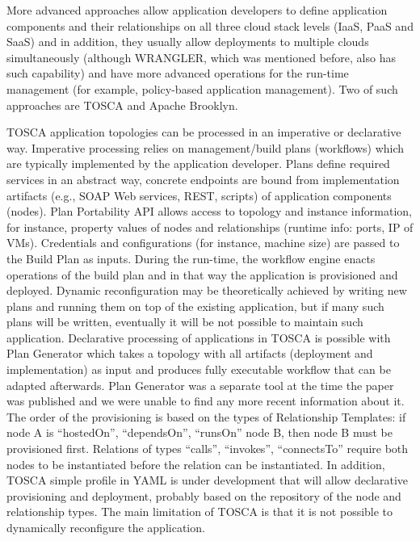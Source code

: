 \noindent 

\noindent More advanced approaches allow application developers to define application components and their relationships on all three cloud stack levels (IaaS, PaaS and SaaS) and in addition, they usually allow deployments to multiple clouds simultaneously (although WRANGLER, which was mentioned before, also has such capability) and have more advanced operations for the run-time management (for example, policy-based application management). Two of such approaches are TOSCA and Apache Brooklyn.  

\noindent 

\noindent TOSCA \cite{INPROC-2013-45} application topologies can be processed in an imperative or declarative way. Imperative processing relies on management/build plans (workflows) which are typically implemented by the application developer. Plans define required services in an abstract way, concrete endpoints are bound from implementation artifacts (e.g., SOAP Web services, REST, scripts) of application components (nodes). Plan Portability API allows access to topology and instance information, for instance, property values of nodes and relationships (runtime info: ports, IP of VMs). Credentials and configurations (for instance, machine size) are passed to the Build Plan as inputs. During the run-time, the workflow engine enacts operations of the build plan and in that way the application is provisioned and deployed. Dynamic reconfiguration may be theoretically achieved by writing new plans and running them on top of the existing application, but if many such plans will be written, eventually it will be not possible to maintain such application. Declarative processing of applications in TOSCA is possible with Plan Generator \cite{Breitenbuecher2014} which takes a topology with all artifacts (deployment and implementation) as input and produces fully executable workflow that can be adapted afterwards. Plan Generator was a separate tool at the time the paper was published and we were unable to find any more recent information about it. The order of the provisioning is based on the types of Relationship Templates: if node A is ``hostedOn'', ``dependsOn'', ``runsOn'' node B, then node B must be provisioned first. Relations of types ``calls'', ``invokes'', ``connectsTo'' require both nodes to be instantiated before the relation can be instantiated. In addition, TOSCA simple profile in YAML \cite{TOSCA-Simple-Profile-YAML-v1.0}is under development that will allow declarative provisioning and deployment, probably based on the repository of the node and relationship types. The main limitation of TOSCA is that it is not possible to dynamically reconfigure the application.


